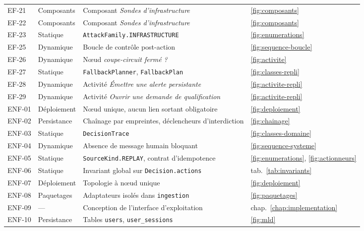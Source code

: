 \begin{table}[H]
\begin{tabular}{@{}llp{5.4cm}l@{}}
EF-21 & Composants & Composant \emph{Sondes d'infrastructure} & \ref{fig:composants} \\
EF-22 & Composants & Composant \emph{Sondes d'infrastructure} & \ref{fig:composants} \\
EF-23 & Statique   & \texttt{AttackFamily.INFRASTRUCTURE} & \ref{fig:enumerations} \\
EF-25 & Dynamique  & Boucle de contr\^ole post-action & \ref{fig:sequence-boucle} \\
EF-26 & Dynamique  & N\oe ud \emph{coupe-circuit ferm\'e ?} & \ref{fig:activite} \\
EF-27 & Statique   & \texttt{FallbackPlanner}, \texttt{FallbackPlan} & \ref{fig:classes-repli} \\
EF-28 & Dynamique  & Activit\'e \emph{\'Emettre une alerte persistante} & \ref{fig:activite-repli} \\
EF-29 & Dynamique  & Activit\'e \emph{Ouvrir une demande de qualification} & \ref{fig:activite-repli} \\
\midrule
ENF-01 & D\'eploiement & N\oe ud unique, aucun lien sortant obligatoire & \ref{fig:deploiement} \\
ENF-02 & Persistance  & Cha\^inage par empreintes, d\'eclencheurs d'interdiction & \ref{fig:chainage} \\
ENF-03 & Statique     & \texttt{DecisionTrace} & \ref{fig:classes-domaine} \\
ENF-04 & Dynamique    & Absence de message humain bloquant & \ref{fig:sequence-systeme} \\
ENF-05 & Statique     & \texttt{SourceKind.REPLAY}, contrat d'idempotence & \ref{fig:enumerations}, \ref{fig:actionneurs} \\
ENF-06 & Statique     & Invariant global sur \texttt{Decision.actions} & tab.~\ref{tab:invariants} \\
ENF-07 & D\'eploiement & Topologie \`a n\oe ud unique & \ref{fig:deploiement} \\
ENF-08 & Paquetages   & Adaptateurs isol\'es dans \texttt{ingestion} & \ref{fig:paquetages} \\
ENF-09 & --- & Conception de l'interface d'exploitation & chap.~\ref{chap:implementation} \\
ENF-10 & Persistance  & Tables \texttt{users}, \texttt{user\_sessions} & \ref{fig:mld} \\
\bottomrule
\end{tabular}
\end{table}

